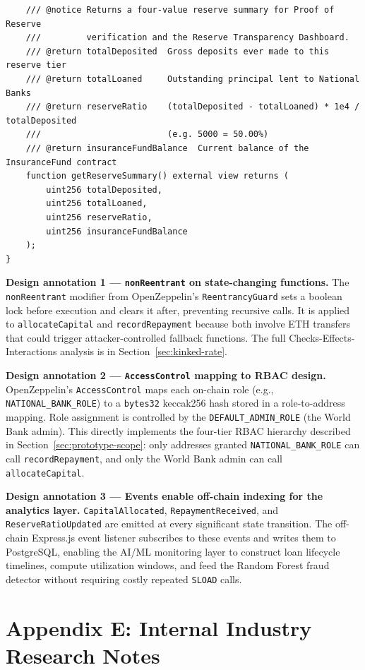 \documentclass[12pt,a4paper]{report}
\begin{document}
\begin{lstlisting}
    /// @notice Returns a four-value reserve summary for Proof of Reserve
    ///         verification and the Reserve Transparency Dashboard.
    /// @return totalDeposited  Gross deposits ever made to this reserve tier
    /// @return totalLoaned     Outstanding principal lent to National Banks
    /// @return reserveRatio    (totalDeposited - totalLoaned) * 1e4 / totalDeposited
    ///                         (e.g. 5000 = 50.00%)
    /// @return insuranceFundBalance  Current balance of the InsuranceFund contract
    function getReserveSummary() external view returns (
        uint256 totalDeposited,
        uint256 totalLoaned,
        uint256 reserveRatio,
        uint256 insuranceFundBalance
    );
}
\end{lstlisting}

\textbf{Design annotation 1 --- \texttt{nonReentrant} on state-changing functions.}
The \texttt{nonReentrant} modifier from OpenZeppelin's \texttt{ReentrancyGuard} sets a boolean lock before execution and clears it after, preventing recursive calls. It is applied to \texttt{allocateCapital} and \texttt{recordRepayment} because both involve ETH transfers that could trigger attacker-controlled fallback functions. The full Checks-Effects-Interactions analysis is in Section~\ref{sec:kinked-rate}.

\textbf{Design annotation 2 --- \texttt{AccessControl} mapping to RBAC design.}
OpenZeppelin's \texttt{AccessControl} maps each on-chain role (e.g., \texttt{NATIONAL\_BANK\_ROLE}) to a \texttt{bytes32} keccak256 hash stored in a role-to-address mapping. Role assignment is controlled by the \texttt{DEFAULT\_ADMIN\_ROLE} (the World Bank admin). This directly implements the four-tier RBAC hierarchy described in Section~\ref{sec:prototype-scope}: only addresses granted \texttt{NATIONAL\_BANK\_ROLE} can call \texttt{recordRepayment}, and only the World Bank admin can call \texttt{allocateCapital}.

\textbf{Design annotation 3 --- Events enable off-chain indexing for the analytics layer.}
\texttt{CapitalAllocated}, \texttt{RepaymentReceived}, and \texttt{ReserveRatioUpdated} are emitted at every significant state transition. The off-chain Express.js event listener subscribes to these events and writes them to PostgreSQL, enabling the AI/ML monitoring layer to construct loan lifecycle timelines, compute utilization windows, and feed the Random Forest fraud detector without requiring costly repeated \texttt{SLOAD} calls.

\chapter*{Appendix E: Internal Industry Research Notes}
{}
\label{app:internal-research}
\end{document}
